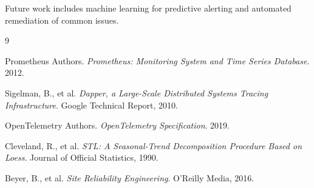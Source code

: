 \documentclass[11pt,a4paper]{article}
\begin{document}
Future work includes machine learning for predictive alerting and automated remediation of common issues.


\begin{thebibliography}{9}

Prometheus Authors.
\textit{Prometheus: Monitoring System and Time Series Database}.
2012.

Sigelman, B., et al.
\textit{Dapper, a Large-Scale Distributed Systems Tracing Infrastructure}.
Google Technical Report, 2010.

OpenTelemetry Authors.
\textit{OpenTelemetry Specification}.
2019.

Cleveland, R., et al.
\textit{STL: A Seasonal-Trend Decomposition Procedure Based on Loess}.
Journal of Official Statistics, 1990.

Beyer, B., et al.
\textit{Site Reliability Engineering}.
O'Reilly Media, 2016.

\end{thebibliography}
\end{document}
